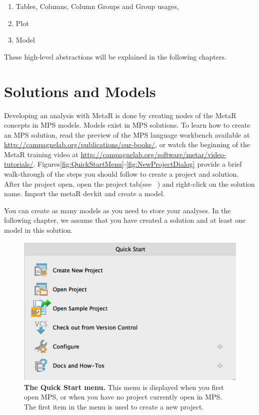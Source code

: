 \begin{enumerate}
	\item Tables, Columns, Column Groups and Group usages,
	\item Plot
	\item Model
\end{enumerate}

\noindent{}These high-level abstractions will be explained in the following chapters.

\section{Solutions and Models}
Developing an analysis with MetaR is done by creating nodes of the MetaR concepts in MPS models. Models exist in MPS solutions. To learn how to create an MPS solution, read the preview of the MPS language workbench available at \url{http://campagnelab.org/publications/our-books/}\cite{campagne2014mps}, or watch the beginning of the MetaR training video at \url{http://campagnelab.org/software/metar/video-tutorials/}. Figures\ref{fig:QuickStartMenu}-\ref{fig:NewProjectDialog} provide a brief walk-through of the steps you should follow to create a project and solution. After the project open, open the project tab(see ~\cite{campagne2014mps}) and right-click on the solution name. Import the metaR devkit and create a model. 

You can create as many models as you need to store your analyses. In the following chapter, we assume that you have created a solution and at least one model in this solution. 


\begin{figure}
  \includegraphics[width=\figWidthNarrow]{figures/QuickStart.png}
  \caption[The Quick Start menu.]{\textbf{The Quick Start menu.} This menu is displayed when you first open MPS, or when you have no project currently open in MPS. The first item in the menu is used to create a new project. 
}
\end{figure}\label{fig:QuickStartMenu}

